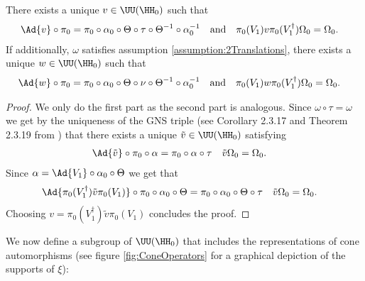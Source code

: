 \begin{lemma}\label{lem:Definition_v_And_w}
	There exists a unique $v\in\UU(\HH_0)$ such that
	\begin{align}
		\Ad{v}\circ\pi_0&=\pi_0\circ\alpha_0\circ\Theta\circ\tau\circ\Theta^{-1}\circ\alpha_0^{-1}&&\text{and}&\pi_0(V_1)v\pi_0(V_1^\dagger)\Omega_0&=\Omega_0.
	\end{align}
	If additionally, $\omega$ satisfies assumption \ref{assumption:2Translations}, there exists a unique $w\in\UU(\HH_0)$ such that
	\begin{align}
		\Ad{w}\circ\pi_0&=\pi_0\circ\alpha_0\circ\Theta\circ\nu\circ\Theta^{-1}\circ\alpha_0^{-1}&&\text{and}&\pi_0(V_1)w\pi_0(V_1^\dagger)\Omega_0&=\Omega_0.
	\end{align}
\end{lemma}
\begin{proof}
	We only do the first part as the second part is analogous. Since $\omega\circ\tau=\omega$ we get by the uniqueness of the GNS triple (see Corollary 2.3.17 and Theorem 2.3.19 from \cite{bratteli1979operator}) that there exists a unique $\tilde{v}\in\UU(\HH_0)$ satisfying
	\begin{align}
		\Ad{\tilde{v}}\circ\pi_0\circ\alpha&=\pi_0\circ\alpha\circ\tau&\tilde{v}\Omega_0&=\Omega_0.
	\end{align}
	Since $\alpha=\Ad{V_1}\circ\alpha_0\circ\Theta$ we get that
	\begin{align}
		\Ad{\pi_0(V_1^\dagger)\tilde{v}\pi_0(V_1)}\circ\pi_0\circ\alpha_0\circ\Theta&=\pi_0\circ\alpha_0\circ\Theta\circ\tau&\tilde{v}\Omega_0&=\Omega_0.
	\end{align}
	Choosing $v=\pi_0(V_1^\dagger)\tilde{v}\pi_0(V_1)$  concludes the proof.
\end{proof}
We now define a subgroup of $\UU(\HH_0)$ that includes the representations of cone automorphisms (see figure \ref{fig:ConeOperators} for a graphical depiction of the supports of $\xi$):
